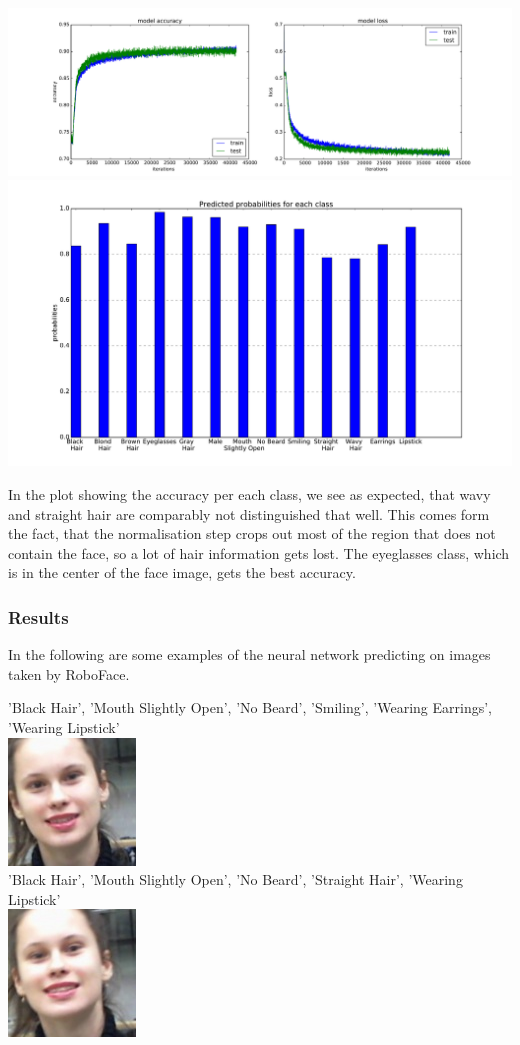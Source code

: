 \documentclass[12.5pt]{scrartcl}
\begin{document}
	\includegraphics[width=\linewidth]{images/lossGood}\\
	\includegraphics[width=0.8\linewidth]{images/accuracy_on_classes}
	
	In the plot showing the accuracy per each class, we see as expected, that wavy and straight hair are comparably not distinguished that well. This comes form the fact, that the normalisation step crops out most of the region that does not contain the face, so a lot of hair information gets lost. The eyeglasses class, which is in the center of the face image, gets the best accuracy.
	
	\subsubsection{Results}
	In the following are some examples of the neural network predicting on images taken by RoboFace.
	
	'Black Hair', 'Mouth Slightly Open', 'No Beard', 'Smiling', 'Wearing Earrings', 'Wearing Lipstick' \\
	\includegraphics[height=0.1\textheight]{images/leti_normalised110} \\ 
	'Black Hair', 'Mouth Slightly Open', 'No Beard', 'Straight Hair', 'Wearing Lipstick' \\
	\includegraphics[height=0.1\textheight]{images/leti_normalised111} 
	
\end{document}

